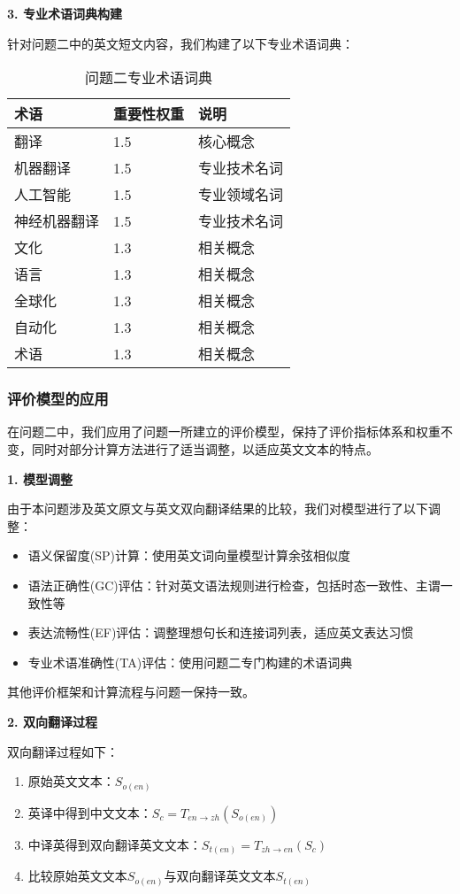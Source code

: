 \documentclass[bwprint]{cumcmthesis}
\begin{document}
\textbf{3. 专业术语词典构建}
    
针对问题二中的英文短文内容，我们构建了以下专业术语词典：

\begin{table}[H]
\centering
\caption{问题二专业术语词典}
\begin{tabularx}{0.8\textwidth}{XXX}
\toprule
术语 & 重要性权重 & 说明 \\
\midrule
翻译 & 1.5 & 核心概念 \\
机器翻译 & 1.5 & 专业技术名词 \\
人工智能 & 1.5 & 专业领域名词 \\
神经机器翻译 & 1.5 & 专业技术名词 \\
文化 & 1.3 & 相关概念 \\
语言 & 1.3 & 相关概念 \\
全球化 & 1.3 & 相关概念 \\
自动化 & 1.3 & 相关概念 \\
术语 & 1.3 & 相关概念 \\
\bottomrule
\end{tabularx}
\label{tab:术语词典2}
\end{table}

\subsubsection{评价模型的应用}
在问题二中，我们应用了问题一所建立的评价模型，保持了评价指标体系和权重不变，同时对部分计算方法进行了适当调整，以适应英文文本的特点。

\textbf{1. 模型调整}

由于本问题涉及英文原文与英文双向翻译结果的比较，我们对模型进行了以下调整：

\begin{itemize}
    \item 语义保留度(SP)计算：使用英文词向量模型计算余弦相似度
    \item 语法正确性(GC)评估：针对英文语法规则进行检查，包括时态一致性、主谓一致性等
    \item 表达流畅性(EF)评估：调整理想句长和连接词列表，适应英文表达习惯
    \item 专业术语准确性(TA)评估：使用问题二专门构建的术语词典
\end{itemize}

其他评价框架和计算流程与问题一保持一致。

\textbf{2. 双向翻译过程}

双向翻译过程如下：
\begin{enumerate}
    \item 原始英文文本：$S_{o(en)}$
    \item 英译中得到中文文本：$S_{c} = T_{en \to zh}(S_{o(en)})$
    \item 中译英得到双向翻译英文文本：$S_{t(en)} = T_{zh \to en}(S_{c})$
    \item 比较原始英文文本$S_{o(en)}$与双向翻译英文文本$S_{t(en)}$
\end{enumerate}
\end{document}
